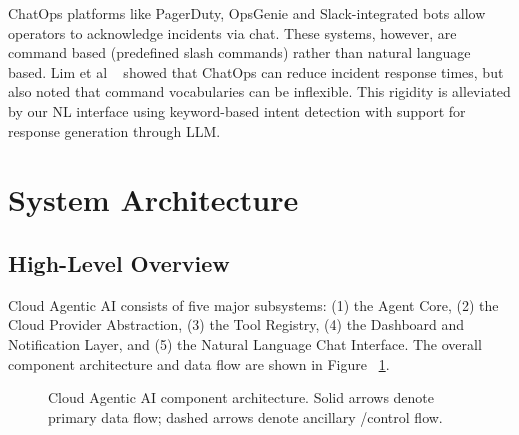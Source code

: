 \documentclass{ieeeaccess}
\begin{document}
ChatOps platforms like PagerDuty, OpsGenie and Slack-integrated bots allow operators to acknowledge incidents via chat. These systems, however, are command based (predefined slash commands) rather than natural language based. Lim et al ~\cite{lim2022chatops} showed that ChatOps can reduce incident response times, but also noted that command vocabularies can be inflexible. This rigidity is alleviated by our NL interface using keyword-based intent detection with support for response generation through LLM.

\section{System Architecture}
\label{sec:arch}

\subsection{High-Level Overview}

Cloud Agentic AI consists of  five major  subsystems: (1) the Agent
Core, (2) the Cloud Provider Abstraction, (3) the Tool Registry, (4) the
Dashboard and Notification Layer, and (5) the Natural Language Chat
Interface.
The overall component architecture and data flow are shown in Figure ~\ref{fig:arch}.

\begin{figure}[ht]
\centering
{}
\caption{Cloud Agentic AI component architecture. Solid arrows denote primary data flow; dashed arrows denote ancillary /control flow.}
\label{fig:arch}
\end{figure}
\end{document}
